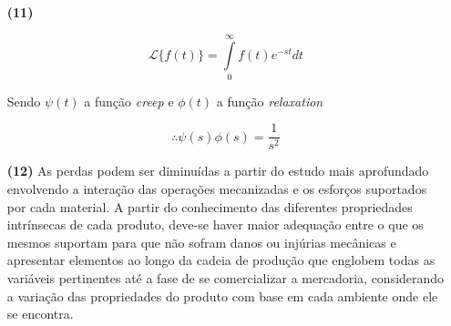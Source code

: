 \documentclass[a4paper, 12pt, brazilian]{article}
\begin{document}
\begin{itemize}
		\item[\textbf{(11)}]
		
		\begin{equation}
			\mathscr{L}\{f(t)\}=\int\limits_{0}^{\infty}f(t)e^{-st}dt
		\end{equation}
		
		Sendo $\psi(t)$ a função \textit{creep} e $\phi(t)$ a função \textit{relaxation}
		
		\begin{equation}
			\therefore\psi(s)\phi(s)=\dfrac{1}{s^{2}}
		\end{equation} 
		
		
		\item[\textbf{(12)}] As perdas podem ser diminuídas a partir do estudo mais aprofundado envolvendo a interação das operações mecanizadas e os esforços suportados por cada material. A partir do conhecimento das diferentes propriedades intrínsecas de cada produto, deve-se haver maior adequação entre o que os mesmos suportam para que não sofram danos ou injúrias mecânicas e apresentar elementos ao longo da cadeia de produção que englobem todas as variáveis pertinentes até a fase de se comercializar a mercadoria, considerando a variação das propriedades do produto com base em cada ambiente onde ele se encontra.
	\end{itemize} 
\end{document}
